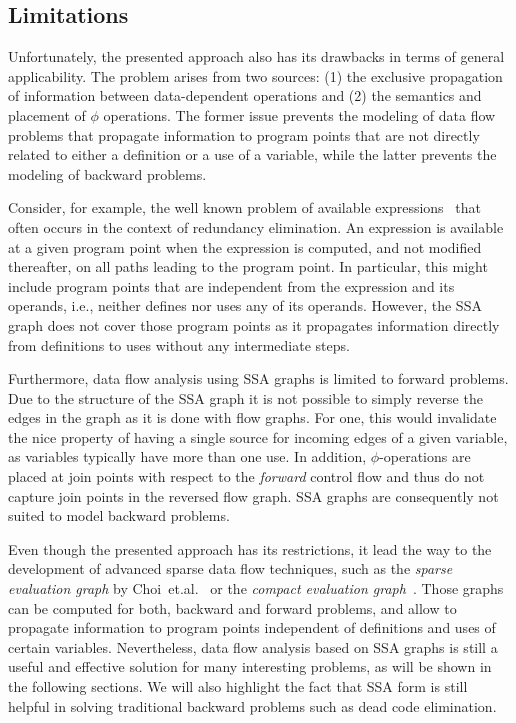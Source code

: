 \subsection{Limitations}

Unfortunately, the presented approach also has its drawbacks in terms of
general applicability. The problem arises from two sources: (1) the exclusive
propagation of information between data-dependent operations and (2) the
semantics and placement of $\phi$ operations. The former issue prevents the
modeling of data flow problems that propagate information to program points that
are not directly related to either a definition or a use of a variable, while
the latter prevents the modeling of backward problems.

Consider, for example, the well known problem of available
expressions~\cite{novillo:bib:NNH99} that often occurs in the context of
redundancy elimination. An expression is available at a given program point when
the expression is computed, and not modified thereafter, on all paths leading to
the program point. In particular, this might include program points that are
independent from the expression and its operands, i.e., neither defines nor uses
any of its operands. However, the SSA graph does not cover those program points
as it propagates information directly from definitions to uses without any
intermediate steps.

Furthermore, data flow analysis using SSA graphs is limited to forward problems.
Due to the structure of the SSA graph it is not possible to simply reverse the
edges in the graph as it is done with flow graphs. For one, this would
invalidate the nice property of having a single source for incoming edges of a
given variable, as variables typically have more than one use. In addition,
$\phi$-operations are placed at join points with respect to the \emph{forward}
control flow and thus do not capture join points in the reversed flow graph.
SSA graphs are consequently not suited to model backward problems.

Even though the presented approach has its restrictions, it lead the way to the
development of advanced sparse data flow techniques, such as the \emph{sparse
evaluation graph} by Choi~et.al.~\cite{novillo:bib:CCF91} or the \emph{compact
evaluation graph}~\cite{novillo:bib:R02}. Those graphs can be computed for both,
backward and forward problems, and allow to propagate information to program
points independent of definitions and uses of certain variables. Nevertheless,
data flow analysis based on SSA graphs is still a useful and effective solution
for many interesting problems, as will be shown in the following sections. We
will also highlight the fact that SSA form is still helpful in solving
traditional backward problems such as dead code elimination.

